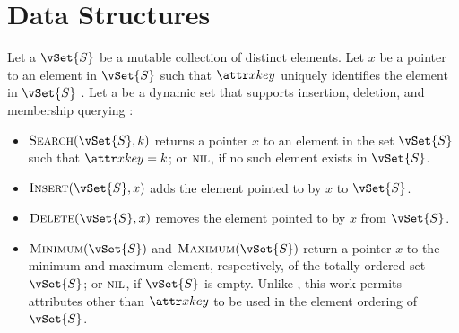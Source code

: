 \chapter{Data Structures}

\newcommand{\vDynamicSet}{\vSet{S}}
\newcommand{\vKey}{k}
\newcommand{\vElement}{x}
\newcommand{\aElementKey}{\aKey{\vElement}}

Let a  $\vDynamicSet$ be a mutable collection of distinct elements. Let $\vElement$ be a pointer to an element in $\vDynamicSet$ such that $\aElementKey$ uniquely identifies the element in $\vDynamicSet$ \cite{Cormen2022}. Let a  be a dynamic set that supports insertion, deletion, and membership querying \cite{Cormen2022}:

\begin{itemize}
    \item $\cSearch[\vDynamicSet, \vKey]$ returns a pointer $\vElement$ to an element in the set $\vDynamicSet$ such that $\aElementKey \equals \vKey$; or $\textsc{nil}$, if no such element exists in $\vDynamicSet$.
    \item $\cInsert[\vDynamicSet, \vElement]$ adds the element pointed to by $\vElement$ to $\vDynamicSet$.
    \item $\cDelete[\vDynamicSet, \vElement]$ removes the element pointed to by $\vElement$ from $\vDynamicSet$.
    \item $\cMinimum[\vDynamicSet]$ and $\cMaximum[\vDynamicSet]$ return a pointer $\vElement$ to the minimum and maximum element, respectively, of the totally ordered set $\vDynamicSet$; or $\textsc{nil}$, if $\vDynamicSet$ is empty. Unlike \cite{Cormen2022}, this work permits attributes other than $\aElementKey$ to be used in the element ordering of $\vDynamicSet$.
\end{itemize}